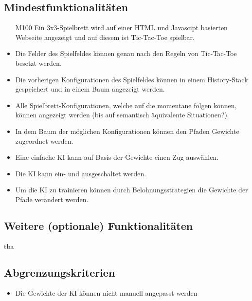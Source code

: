 \documentclass[titlepage]{scrartcl}
\begin{document}
\subsection{Mindestfunktionalitäten}
		\begin{itemize}
			\item[M100] Ein 3x3-Spielbrett wird auf einer HTML und Javascipt basierten Webseite angezeigt und auf diesem ist Tic-Tac-Toe spielbar.
			\item Die Felder des Spielfeldes können genau nach den Regeln von Tic-Tac-Toe besetzt werden.
			\item Die vorherigen Konfigurationen des Spielfeldes können in einem History-Stack gespeichert und in einem Baum angezeigt werden.
			\item Alle Spielbrett-Konfigurationen, welche auf die momentane folgen können, können angezeigt werden (bis auf semantisch äquivalente Situationen?).
			\item In dem Baum der möglichen Konfigurationen können den Pfaden Gewichte zugeordnet werden.
			\item Eine einfache KI kann auf Basis der Gewichte einen Zug auswählen.
			\item Die KI kann ein- und ausgeschaltet werden.
			\item Um die KI zu trainieren können durch Belohnungsstrategien die Gewichte der Pfade verändert werden.
		\end{itemize}
\subsection{Weitere (optionale) Funktionalitäten}
	tba
\subsection{Abgrenzungskriterien}
	\begin{itemize}
		\item Die Gewichte der KI können nicht manuell angepasst werden
	\end{itemize}
\end{document}
